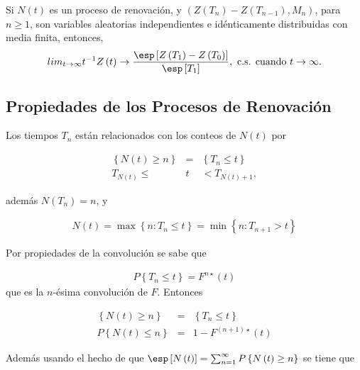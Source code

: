 \begin{Coro}
Si $N\left(t\right)$ es un proceso de renovaci\'on, y $\left(Z\left(T_{n}\right)-Z\left(T_{n-1}\right),M_{n}\right)$, para $n\geq1$, son variables aleatorias independientes e id\'enticamente distribuidas con media finita, entonces,
\begin{eqnarray}
lim_{t\rightarrow\infty}t^{-1}Z\left(t\right)\rightarrow\frac{\esp\left[Z\left(T_{1}\right)-Z\left(T_{0}\right)\right]}{\esp\left[T_{1}\right]},\textrm{ c.s. cuando  }t\rightarrow\infty.
\end{eqnarray}
\end{Coro}

%
\subsection{Propiedades de los Procesos de Renovaci\'on}
%

Los tiempos $T_{n}$ est\'an relacionados con los conteos de $N\left(t\right)$ por

\begin{eqnarray*}
\left\{N\left(t\right)\geq n\right\}&=&\left\{T_{n}\leq t\right\}\\
T_{N\left(t\right)}\leq &t&<T_{N\left(t\right)+1},
\end{eqnarray*}

adem\'as $N\left(T_{n}\right)=n$, y 

\begin{eqnarray*}
N\left(t\right)=\max\left\{n:T_{n}\leq t\right\}=\min\left\{n:T_{n+1}>t\right\}
\end{eqnarray*}

Por propiedades de la convoluci\'on se sabe que

\begin{eqnarray*}
P\left\{T_{n}\leq t\right\}=F^{n\star}\left(t\right)
\end{eqnarray*}
que es la $n$-\'esima convoluci\'on de $F$. Entonces 

\begin{eqnarray*}
\left\{N\left(t\right)\geq n\right\}&=&\left\{T_{n}\leq t\right\}\\
P\left\{N\left(t\right)\leq n\right\}&=&1-F^{\left(n+1\right)\star}\left(t\right)
\end{eqnarray*}

Adem\'as usando el hecho de que $\esp\left[N\left(t\right)\right]=\sum_{n=1}^{\infty}P\left\{N\left(t\right)\geq n\right\}$
se tiene que

